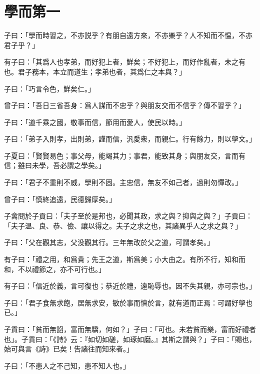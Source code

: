 \section[學而第一]{學而第一}

子曰：「學而時習之，不亦説乎？有朋自遠方來，不亦樂乎？人不知而不愠，不亦君子乎？」

有子曰：「其爲人也孝弟，而好犯上者，鮮矣；不好犯上，而好作亂者，未之有也。君子務本，本立而道生；孝弟也者，其爲仁之本與？」

子曰：「巧言令色，鮮矣仁。」

曾子曰：「吾日三省吾身：爲人謀而不忠乎？與朋友交而不信乎？傳不習乎？」

子曰：「道千乘之國，敬事而信，節用而愛人，使民以時。」

子曰：「弟子入則孝，出則弟，謹而信，汎愛衆，而親仁。行有餘力，則以學文。」

子夏曰：「賢賢易色；事父母，能竭其力；事君，能致其身；與朋友交，言而有信；雖曰未學，吾必謂之學矣。」

子曰：「君子不重則不威，學則不固。主忠信，無友不如己者，過則勿憚改。」

曾子曰：「慎終追遠，民德歸厚矣。」

子禽問於子貢曰：「夫子至於是邦也，必聞其政，求之與？抑與之與？」子貢曰：「夫子温、良、恭、儉、讓以得之。夫子之求之也，其諸異乎人之求之與？」

子曰：「父在觀其志，父没觀其行。三年無改於父之道，可謂孝矣。」

有子曰：「禮之用，和爲貴；先王之道，斯爲美；小大由之。有所不行，知和而和，不以禮節之，亦不可行也。」

有子曰：「信近於義，言可復也；恭近於禮，遠恥辱也。因不失其親，亦可宗也。」

子曰：「君子食無求飽，居無求安，敏於事而慎於言，就有道而正焉：可謂好學也已。」

子貢曰：「貧而無諂，富而無驕，何如？」子曰：「可也。未若貧而樂，富而好禮者也」。子貢曰：「《詩》云：『如切如磋，如琢如磨。』其斯之謂與？」子曰：「賜也，始可與言《詩》已矣！告諸往而知來者。」

子曰：「不患人之不己知，患不知人也。」
